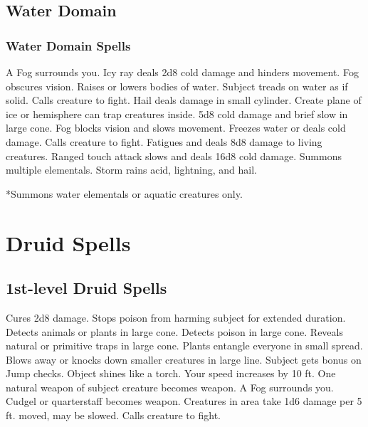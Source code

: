 \subsection{Water Domain}
\subsubsection{Water Domain Spells}
\begin{spelllist}
 A Fog surrounds you.
 Icy ray deals 2d8 cold damage and hinders movement.
 Fog obscures vision.
\spellhead[2]{}
 Raises or lowers bodies of water.
 Subject treads on water as if solid.
\spellhead[4]{}
 Calls creature to fight.
 Hail deals damage in small cylinder.
 Create plane of ice or hemisphere can trap creatures inside.
 5d8 cold damage and brief slow in large cone.
 Fog blocks vision and slows movement.
 Freezes water or deals cold damage.
 Calls creature to fight.
 Fatigues and deals 8d8 damage to living creatures.
 Ranged touch attack slows and deals 16d8 cold damage.
 Summons multiple elementals.
 Storm rains acid, lightning, and hail.
\end{spelllist}
*Summons water elementals or aquatic creatures only.


\section{Druid Spells}

\subsection{1st-level Druid Spells}
\begin{spelllist}
 Cures 2d8 damage.
 Stops poison from harming subject for extended duration.
 Detects animals or plants in large cone.
 Detects poison in large cone.
 Reveals natural or primitive traps in large cone.
 Plants entangle everyone in small spread.
 Blows away or knocks down smaller creatures in large line.
 Subject gets bonus on Jump checks.
 Object shines like a torch.
 Your speed increases by 10 ft.
 One natural weapon of subject creature becomes  weapon.
 A Fog surrounds you.
 Cudgel or quarterstaff becomes  weapon.
 Creatures in area take 1d6 damage per 5 ft. moved, may be slowed.
 Calls creature to fight.
\end{spelllist}

